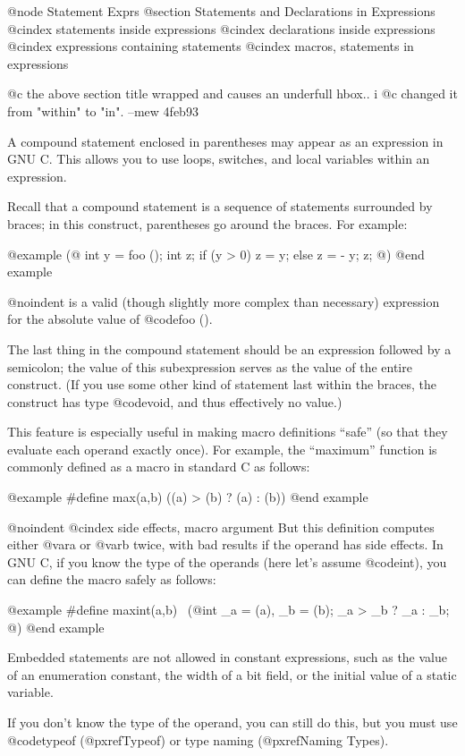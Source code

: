 @node Statement Exprs
@section Statements and Declarations in Expressions
@cindex statements inside expressions
@cindex declarations inside expressions
@cindex expressions containing statements
@cindex macros, statements in expressions

@c the above section title wrapped and causes an underfull hbox.. i
@c changed it from "within" to "in". --mew 4feb93

A compound statement enclosed in parentheses may appear as an expression
in GNU C.  This allows you to use loops, switches, and local variables
within an expression.

Recall that a compound statement is a sequence of statements surrounded
by braces; in this construct, parentheses go around the braces.  For
example:

@example
(@{ int y = foo (); int z;
   if (y > 0) z = y;
   else z = - y;
   z; @})
@end example

@noindent
is a valid (though slightly more complex than necessary) expression
for the absolute value of @code{foo ()}.

The last thing in the compound statement should be an expression
followed by a semicolon; the value of this subexpression serves as the
value of the entire construct.  (If you use some other kind of statement
last within the braces, the construct has type @code{void}, and thus
effectively no value.)

This feature is especially useful in making macro definitions ``safe'' (so
that they evaluate each operand exactly once).  For example, the
``maximum'' function is commonly defined as a macro in standard C as
follows:

@example
#define max(a,b) ((a) > (b) ? (a) : (b))
@end example

@noindent
@cindex side effects, macro argument
But this definition computes either @var{a} or @var{b} twice, with bad
results if the operand has side effects.  In GNU C, if you know the
type of the operands (here let's assume @code{int}), you can define
the macro safely as follows:

@example
#define maxint(a,b) \
  (@{int _a = (a), _b = (b); _a > _b ? _a : _b; @})
@end example

Embedded statements are not allowed in constant expressions, such as
the value of an enumeration constant, the width of a bit field, or
the initial value of a static variable.

If you don't know the type of the operand, you can still do this, but you
must use @code{typeof} (@pxref{Typeof}) or type naming (@pxref{Naming
Types}).

